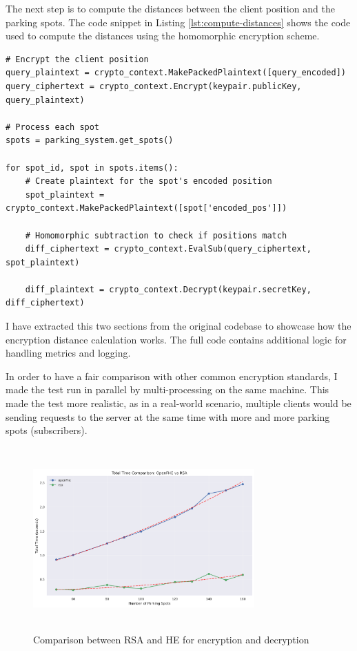 The next step is to compute the distances between the client position and the parking spots. The code snippet in Listing \ref{lst:compute-distances} shows the code used to compute the distances using the homomorphic encryption scheme.

\begin{lstlisting}[caption={Computing distances using Homomorphic Encryption}, label={lst:compute-distances}]
# Encrypt the client position
query_plaintext = crypto_context.MakePackedPlaintext([query_encoded])
query_ciphertext = crypto_context.Encrypt(keypair.publicKey, query_plaintext)

# Process each spot
spots = parking_system.get_spots()

for spot_id, spot in spots.items():
    # Create plaintext for the spot's encoded position
    spot_plaintext = crypto_context.MakePackedPlaintext([spot['encoded_pos']])
    
    # Homomorphic subtraction to check if positions match
    diff_ciphertext = crypto_context.EvalSub(query_ciphertext, spot_plaintext)
                
    diff_plaintext = crypto_context.Decrypt(keypair.secretKey, diff_ciphertext)

\end{lstlisting}

I have extracted this two sections from the original codebase to showcase how the encryption distance calculation works. The full code contains additional logic for handling metrics and logging.

In order to have a fair comparison with other common encryption standards, I made the test run in parallel by multi-processing on the same machine. This made the test more realistic, as in a real-world scenario, multiple clients would be sending requests to the server at the same time with more and more parking spots (subscribers).

\begin{figure}[h]
    \centering
    \includegraphics[width=8.5cm,height=7cm]{img/total_time_comparison.png}
    \caption{Comparison between RSA and HE for encryption and decryption}
    \label{fig:he-vs-rsa}
\end{figure}

